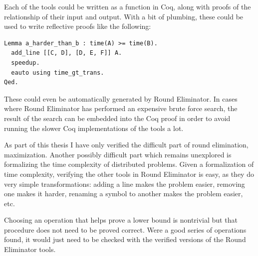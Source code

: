 \documentclass[english, 12pt, a4paper, sci, a-1b, online]{aaltothesis}
\begin{document}
Each of the tools could be written as a function in Coq, along with proofs of the relationship of their input and output. With a bit of plumbing, these could be used to write reflective proofs like the following:

\begin{verbatim}
Lemma a_harder_than_b : time(A) >= time(B).
  add_line [[C, D], [D, E, F]] A.
  speedup.
  eauto using time_gt_trans.
Qed.
\end{verbatim}

These could even be automatically generated by Round Eliminator. In cases where Round Eliminator has performed an expensive brute force search, the result of the search can be embedded into the Coq proof in order to avoid running the slower Coq implementations of the tools a lot.

As part of this thesis I have only verified the difficult part of round elimination, maximization. Another possibly difficult part which remains unexplored is formalizing the time complexity of distributed problems. Given a formalization of time complexity, verifying the other tools in Round Eliminator is easy, as they do very simple transformations: adding a line makes the problem easier, removing one makes it harder, renaming a symbol to another makes the problem easier, etc.

Choosing an operation that helps prove a lower bound is nontrivial but that procedure does not need to be proved correct. Were a good series of operations found, it would just need to be checked with the verified versions of the Round Eliminator tools.

\clearpage
\thesisbibliography{}



\end{document}
